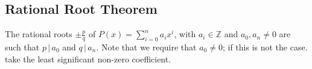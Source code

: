 \subsection{Rational Root Theorem}

The rational roots $\pm \frac p q$ of $P(x) = \sum_{i=0}^n a_i x^i$, with $a_i \in \mathbb Z$ and $a_0, a_n \neq 0$ are such that $p \,|\, a_0$ and $q \,|\, a_n$. Note that we require that $a_0 \neq 0$; if this is not the case. take the least significant non-zero coefficient.
